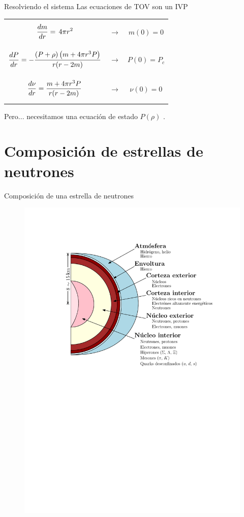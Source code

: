 \documentclass[11pt]{beamer}
\begin{document}
\begin{frame}{Resolviendo el sistema}
    Las ecuaciones de TOV son un IVP
    \begin{table}[]
        \begin{tabular}{ccc}
            \parbox{3cm}{\begin{equation*}\dv{m}{r} =\, 4 \pi r ^ { 2 }\end{equation*}}       & $\longrightarrow$                     & $m(0)=0$ \\
            \parbox{5cm}{\begin{equation*}
                \dv{P}{r} = - \frac { ( P  + \rho ) \left( m  + 4 \pi r ^ { 3 } P \right) } { r ( r - 2 m ) }
            \end{equation*}}     &       $\longrightarrow$      &       $P(0)=P_c$ \\
            \parbox{4cm}{\begin{equation*}
                \dv{\nu}{r} = \frac { m  + 4 \pi r ^ { 3 } P  } { r ( r - 2 m  ) }
            \end{equation*}}  &       $\longrightarrow$      &       $\nu(0)=0$
        \end{tabular}
    \end{table}
    \alert{Pero...} necesitamos una ecuación de estado $P(\rho)$ .
\end{frame}

\section{Composición de estrellas de neutrones}
\begin{frame}{Composición de una estrella de neutrones}
    \begin{figure}
        \centering
        \includegraphics[width=0.7\linewidth]{neutronstar.pdf}
    \end{figure}
\end{frame}
\end{document}
